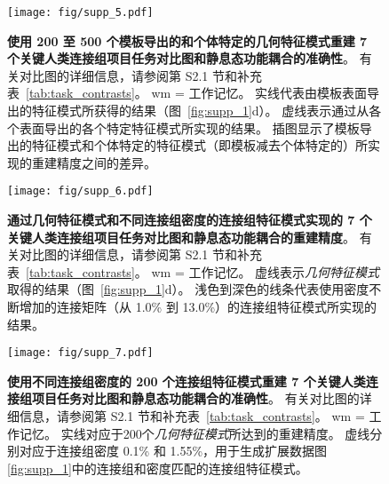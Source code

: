 \documentclass[lang=cn,a4paper,newtx,citestyle=gb7714-2015, bibstyle=gb7714-2015]{elegantpaper}
\begin{document}
\begin{figure}[!htb] 
	\centering
	\texttt{[image: fig/supp\_5.pdf]}
	\caption{\textbf{使用 200 至 500 个模板导出的和个体特定的几何特征模式重建 7 个关键人类连接组项目任务对比图和静息态功能耦合的准确性}。
		有关对比图的详细信息，请参阅第 S2.1 节和补充表~\ref{tab:task_contrasts}。
		wm = 工作记忆。
		实线代表由模板表面导出的特征模式所获得的结果（图~\ref{fig:supp_1}d）。
		虚线表示通过从各个表面导出的各个特定特征模式所实现的结果。
		插图显示了模板导出的特征模式和个体特定的特征模式（即模板减去个体特定的）所实现的重建精度之间的差异。} \label{fig:supp_5}
\end{figure}



\begin{figure}[!htb] 
	\centering
	\texttt{[image: fig/supp\_6.pdf]}
	\caption{
		\textbf{通过几何特征模式和不同连接组密度的连接组特征模式实现的 7 个关键人类连接组项目任务对比图和静息态功能耦合的重建精度}。
		有关对比图的详细信息，请参阅第 S2.1 节和补充表~\ref{tab:task_contrasts}。
		wm = 工作记忆。
		虚线表示\textit{几何特征模式}取得的结果（图~\ref{fig:supp_1}d）。
		浅色到深色的线条代表使用密度不断增加的连接矩阵（从 1.0\% 到 13.0\%）的连接组特征模式所实现的结果。
	} \label{fig:supp_6}
\end{figure}


\begin{figure}[!htb] 
	\centering
	\texttt{[image: fig/supp\_7.pdf]}
	\caption{
		\textbf{使用不同连接组密度的 200 个连接组特征模式重建 7 个关键人类连接组项目任务对比图和静息态功能耦合的准确性}。
		有关对比图的详细信息，请参阅第 S2.1 节和补充表~\ref{tab:task_contrasts}。
		wm = 工作记忆。
		实线对应于200个\textit{几何特征模式}所达到的重建精度。
		虚线分别对应于连接组密度 0.1\% 和 1.55\%，用于生成扩展数据图\ref{fig:supp_1}中的连接组和密度匹配的连接组特征模式。
	} \label{fig:supp_7}
\end{figure}
\end{document}
